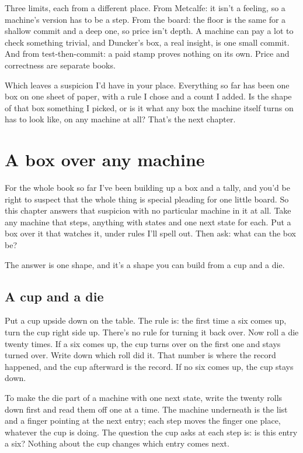 \documentclass[11pt,twoside]{article}
\theoremstyle{thielethm}
\theoremstyle{thieledef}
\theoremstyle{thieledef}
\theoremstyle{thieledef}
\theoremstyle{thielethm}
\theoremstyle{thieleobs}
\theoremstyle{thielethm}
\begin{document}
Three limits, each from a different place. From Metcalfe: it isn't a feeling, so a machine's version has to be a step. From the board: the floor is the same for a shallow commit and a deep one, so price isn't depth. A machine can pay a lot to check something trivial, and Duncker's box, a real insight, is one small commit. And from test-then-commit: a paid stamp proves nothing on its own. Price and correctness are separate books.

Which leaves a suspicion I'd have in your place. Everything so far has been one box on one sheet of paper, with a rule I chose and a count I added. Is the shape of that box something I picked, or is it what any box the machine itself turns on has to look like, on any machine at all? That's the next chapter.

\section{A box over any machine}
\label{sec:any-machine}

For the whole book so far I've been building up a box and a tally, and you'd be right to suspect that the whole thing is special pleading for one little board. So this chapter answers that suspicion with no particular machine in it at all. Take any machine that steps, anything with states and one next state for each. Put a box over it that watches it, under rules I'll spell out. Then ask: what can the box be?

The answer is one shape, and it's a shape you can build from a cup and a die.

\subsection{A cup and a die}

Put a cup upside down on the table. The rule is: the first time a six comes up, turn the cup right side up. There's no rule for turning it back over. Now roll a die twenty times. If a six comes up, the cup turns over on the first one and stays turned over. Write down which roll did it. That number is where the record happened, and the cup afterward is the record. If no six comes up, the cup stays down.

To make the die part of a machine with one next state, write the twenty rolls down first and read them off one at a time. The machine underneath is the list and a finger pointing at the next entry; each step moves the finger one place, whatever the cup is doing. The question the cup asks at each step is: is this entry a six? Nothing about the cup changes which entry comes next.
\end{document}
